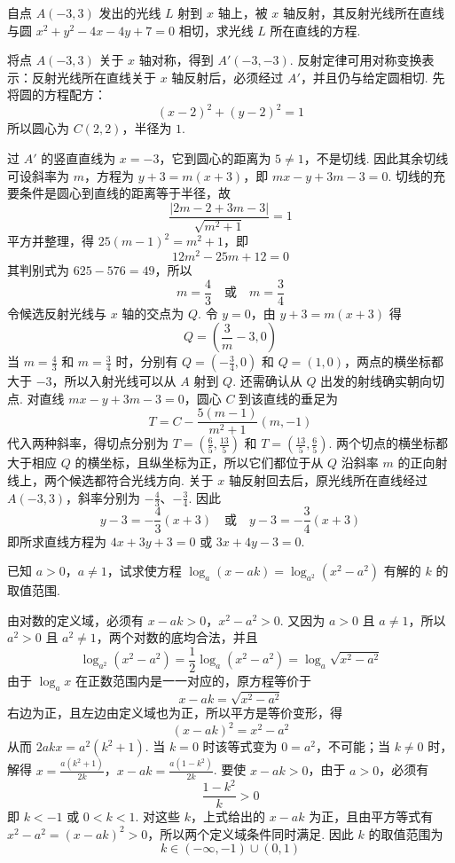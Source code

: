 \documentclass[UTF8,a4paper,oneside,11pt]{ctexbook}
\begin{document}
\begin{problem}
自点 \(A(-3,3)\) 发出的光线 \(L\) 射到 \(x\) 轴上，被 \(x\) 轴反射，其反射光线所在直线与圆 \(x^2 + y^2 - 4x - 4y + 7 = 0\) 相切，求光线 \(L\) 所在直线的方程.
\end{problem}

\begin{solution}
将点 \(A(-3,3)\) 关于 \(x\) 轴对称，得到 \(A'(-3,-3)\). 反射定律可用对称变换表示：反射光线所在直线关于 \(x\) 轴反射后，必须经过 \(A'\)，并且仍与给定圆相切. 先将圆的方程配方：
\[
(x-2)^2+(y-2)^2=1
\]
所以圆心为 \(C(2,2)\)，半径为 \(1\).

过 \(A'\) 的竖直直线为 \(x=-3\)，它到圆心的距离为 \(5\neq1\)，不是切线. 因此其余切线可设斜率为 \(m\)，方程为 \(y+3=m(x+3)\)，即 \(mx-y+3m-3=0\). 切线的充要条件是圆心到直线的距离等于半径，故
\[
\frac{|2m-2+3m-3|}{\sqrt{m^2+1}}=1
\]
平方并整理，得 \(25(m-1)^2=m^2+1\)，即
\[
12m^2-25m+12=0
\]
其判别式为 \(625-576=49\)，所以
\[
m=\frac{4}{3}\quad\text{或}\quad m=\frac{3}{4}
\]
令候选反射光线与 \(x\) 轴的交点为 \(Q\). 令 \(y=0\)，由 \(y+3=m(x+3)\) 得
\[
Q=\left(\frac{3}{m}-3,0\right)
\]
当 \(m=\frac{4}{3}\) 和 \(m=\frac{3}{4}\) 时，分别有 \(Q=\left(-\frac{3}{4},0\right)\) 和 \(Q=(1,0)\)，两点的横坐标都大于 \(-3\)，所以入射光线可以从 \(A\) 射到 \(Q\). 还需确认从 \(Q\) 出发的射线确实朝向切点. 对直线 \(mx-y+3m-3=0\)，圆心 \(C\) 到该直线的垂足为
\[
T=C-\frac{5(m-1)}{m^2+1}(m,-1)
\]
代入两种斜率，得切点分别为 \(T=\left(\frac65,\frac{13}5\right)\) 和 \(T=\left(\frac{13}5,\frac65\right)\). 两个切点的横坐标都大于相应 \(Q\) 的横坐标，且纵坐标为正，所以它们都位于从 \(Q\) 沿斜率 \(m\) 的正向射线上，两个候选都符合光线方向. 关于 \(x\) 轴反射回去后，原光线所在直线经过 \(A(-3,3)\)，斜率分别为 \(-\frac43\)、\(-\frac34\). 因此
\[
y-3=-\frac{4}{3}(x+3)\quad\text{或}\quad y-3=-\frac{3}{4}(x+3)
\]
即所求直线方程为 \(4x+3y+3=0\) 或 \(3x+4y-3=0\).
\end{solution}

\begin{problem}
已知 \(a > 0\)，\(a \neq 1\)，试求使方程 \(\log_a(x - ak) = \log_{a^2}(x^2 - a^2)\) 有解的 \(k\) 的取值范围.
\end{problem}

\begin{solution}
由对数的定义域，必须有
\(x-ak>0\)，\(x^2-a^2>0\).
又因为 \(a>0\) 且 \(a\neq1\)，所以 \(a^2>0\) 且 \(a^2\neq1\)，两个对数的底均合法，并且
\[
\log_{a^2}(x^2-a^2)=\frac{1}{2}\log_a(x^2-a^2)=\log_a\sqrt{x^2-a^2}
\]
由于 \(\log_a x\) 在正数范围内是一一对应的，原方程等价于
\[
x-ak=\sqrt{x^2-a^2}
\]
右边为正，且左边由定义域也为正，所以平方是等价变形，得
\[
(x-ak)^2=x^2-a^2
\]
从而 \(2akx=a^2(k^2+1)\). 当 \(k=0\) 时该等式变为 \(0=a^2\)，不可能；当 \(k\neq0\) 时，解得
\(x=\frac{a(k^2+1)}{2k}\)，\(x-ak=\frac{a(1-k^2)}{2k}\).
要使 \(x-ak>0\)，由于 \(a>0\)，必须有
\[
\frac{1-k^2}{k}>0
\]
即 \(k<-1\) 或 \(0<k<1\). 对这些 \(k\)，上式给出的 \(x-ak\) 为正，且由平方等式有 \(x^2-a^2=(x-ak)^2>0\)，所以两个定义域条件同时满足. 因此 \(k\) 的取值范围为
\[
k\in(-\infty,-1)\cup(0,1)
\]
\end{solution}
\end{document}
